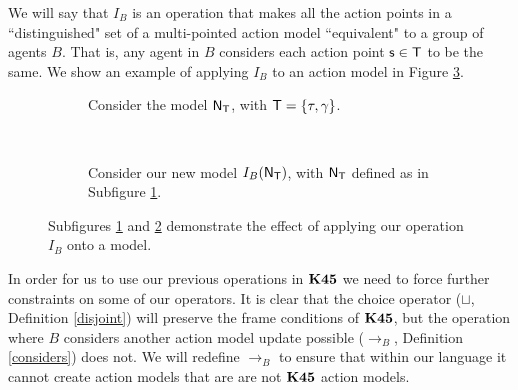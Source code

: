 We will say that $I_B$ is an operation that makes all the action
points in a ``distinguished" set of a multi-pointed action model ``equivalent" to a
group of agents $B$.
That is, any agent in $B$ considers each action point $\mathrm{\mathsf{s}} \in \mathrm{\mathsf{T}}$ to be the
same.
We show an example of applying $I_B$ to an action model in Figure \ref{beforeAfterI}.

\begin{figure}
\centering
\begin{subfigure}[b]{.45\textwidth}
\centering
{}
\caption{Consider the model $\mathrm{\mathsf{N}}_\mathrm{\mathsf{T}}$, with $\mathrm{\mathsf{T}} = \{\tau, \gamma\}$.}
\label{beforeOperation}
\end{subfigure}
~
\begin{subfigure}[b]{.45\textwidth}
\centering
{}
\caption{Consider our new model $I_B(\mathrm{\mathsf{N}}_\mathrm{\mathsf{T}})$, with $\mathrm{\mathsf{N}}_\mathrm{\mathsf{T}}$ defined as in Subfigure
\ref{beforeOperation}.}
\label{afterOperation}
\end{subfigure}
\caption[Result of applying $I_B$]{Subfigures \ref{beforeOperation} and \ref{afterOperation} demonstrate the effect of
applying our operation $I_B$ onto a model.}
\label{beforeAfterI}
\end{figure}

In order for us to use our previous operations in $\bf K45$ we need to force further constraints on
some of our operators.
It is clear that the choice operator ($\sqcup$, Definition \ref{disjoint}) will preserve the frame
conditions of $\bf K45$, but the operation where $B$ considers another action model update possible
($\to_B$, Definition \ref{considers}) does not.
We will redefine $\to_B$ to ensure that within our language it cannot create action models that are
are not $\bf K45$ action models.

